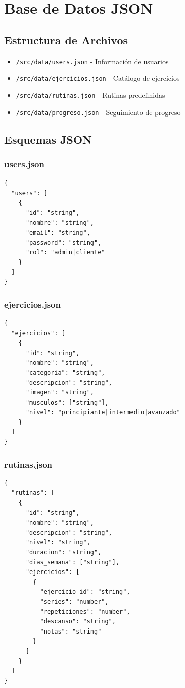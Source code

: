 \documentclass[12pt,a4paper]{article}
\begin{document}
\section{Base de Datos JSON}

\subsection{Estructura de Archivos}
\begin{itemize}
    \item \texttt{/src/data/users.json} - Información de usuarios
    \item \texttt{/src/data/ejercicios.json} - Catálogo de ejercicios
    \item \texttt{/src/data/rutinas.json} - Rutinas predefinidas
    \item \texttt{/src/data/progreso.json} - Seguimiento de progreso
\end{itemize}

\subsection{Esquemas JSON}

\subsubsection{users.json}
\begin{verbatim}
{
  "users": [
    {
      "id": "string",
      "nombre": "string",
      "email": "string",
      "password": "string",
      "rol": "admin|cliente"
    }
  ]
}
\end{verbatim}

\subsubsection{ejercicios.json}
\begin{verbatim}
{
  "ejercicios": [
    {
      "id": "string",
      "nombre": "string",
      "categoria": "string",
      "descripcion": "string",
      "imagen": "string",
      "musculos": ["string"],
      "nivel": "principiante|intermedio|avanzado"
    }
  ]
}
\end{verbatim}

\subsubsection{rutinas.json}
\begin{verbatim}
{
  "rutinas": [
    {
      "id": "string",
      "nombre": "string",
      "descripcion": "string",
      "nivel": "string",
      "duracion": "string",
      "dias_semana": ["string"],
      "ejercicios": [
        {
          "ejercicio_id": "string",
          "series": "number",
          "repeticiones": "number",
          "descanso": "string",
          "notas": "string"
        }
      ]
    }
  ]
}
\end{verbatim}
\end{document}
